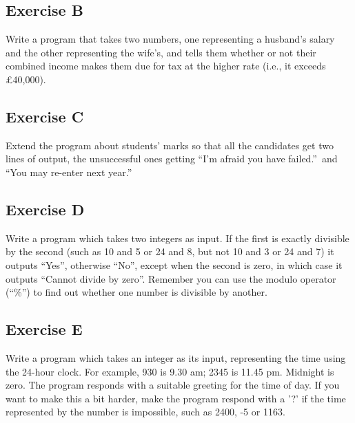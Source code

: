 
\subsection*{Exercise B}

Write a program that takes two numbers, one representing a
husband's salary and the other representing the wife's, and tells them
whether or not their combined income makes them due for tax at the higher rate
(i.e., it exceeds \pounds 40,000).

\subsection*{Exercise C}

Extend the program about students' marks so that all the candidates
get two lines of output, the unsuccessful ones getting ``I'm afraid you
have failed.''\ and ``You may re-enter next year.''

\subsection*{Exercise D}

Write a program which takes two integers as input.
If the first is exactly divisible
by the second (such as 10 and 5 or 24 and 8, but not 10 and 3 or 24 and 7)
it outputs ``Yes'', otherwise ``No'', except when the second
is zero, in which case it outputs ``Cannot divide by zero''. Remember
you can use the modulo operator (``\%'') to find out whether one
number is divisible by another. 

\subsection*{Exercise E}

Write a program which takes an integer as its input, representing the time
using the 24-hour clock.  For example, 930 is 9.30 am; 2345 is 11.45 pm.  Midnight is
zero. The program responds with a suitable greeting for the time of day.
If you want to make this a bit harder, make the program respond with a '?'
if the time represented by the number is impossible, such as 2400, -5 or
1163.





